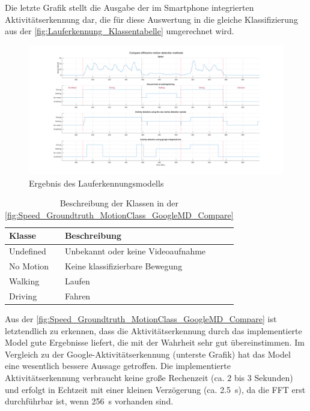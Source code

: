 Die letzte Grafik stellt die Ausgabe der im Smartphone integrierten Aktivitäts\-erkenn\-ung dar, die für diese Auswertung in die gleiche Klassifizierung aus der \autoref{fig:Lauferkennung_Klassentabelle} umgerechnet wird.

\begin{figure}
	\centering
	\includegraphics[width=\linewidth]{Bilder/Speed_Groundtruth_MotionClass_GoogleMD_Compare.png}
	\caption{Ergebnis des Lauferkennungsmodells}
	\label{fig:Speed_Groundtruth_MotionClass_GoogleMD_Compare}
\end{figure}

\begin{table}[thbp]
	\caption{Beschreibung der Klassen in der \autoref{fig:Speed_Groundtruth_MotionClass_GoogleMD_Compare}}
	\label{fig:Lauferkennung_Klassentabelle}
	\centering
	\begin{tabular}{|l|l|}
		\hline
		\textbf{Klasse} & \textbf{Beschreibung}\\
		\hline
		Undefined & Unbekannt oder keine Videoaufnahme\\ 
		\hline
		No Motion &  Keine klassifizierbare Bewegung\\ 
		\hline
		Walking & Laufen\\ 
		\hline
		Driving & Fahren\\ 
		\hline
	\end{tabular}
\end{table}

Aus der \autoref{fig:Speed_Groundtruth_MotionClass_GoogleMD_Compare} ist letztendlich zu erkennen, dass die Aktivitäts\-erkenn\-ung durch das implementierte Model gute Ergebnisse liefert, die mit der Wahrheit sehr gut übereinstimmen. Im Vergleich zu der Google-Aktivitäts\-erkenn\-ung (unterste Grafik) hat das Model eine wesentlich bessere Aussage getroffen. Die implementierte Aktivitätserkennung verbraucht keine große Rechenzeit (ca. $2$ bis $3$ Sekunden) und erfolgt in Echtzeit mit einer kleinen Verzögerung (ca. \SI{2,5}{\second}), da die FFT erst durchführbar ist, wenn \SI{256}{\second} vorhanden sind.



